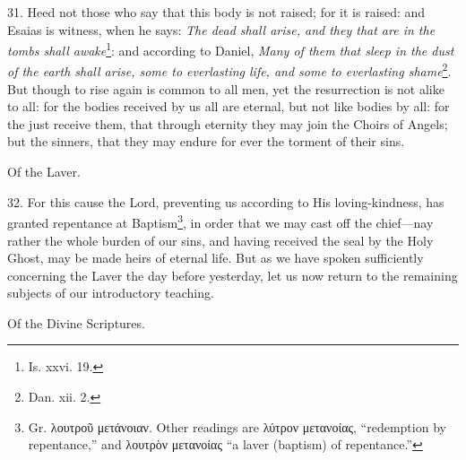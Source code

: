 31. Heed not those who say that this body is not raised; for it is raised: and Esaias is witness, when he says: \emph{The dead shall arise, and they that are in the tombs shall awake}\footnote{Is. xxvi. 19.}: and according to Daniel, \emph{Many of them that sleep in the dust of the earth shall arise, some to everlasting life, and some to everlasting shame}\footnote{Dan. xii. 2.}. But though to rise again is common to all men, yet the resurrection is not alike to all: for the bodies received by us all are eternal, but not like bodies by all: for the just receive them, that through eternity they may join the Choirs of Angels; but the sinners, that they may endure for ever the torment of their sins.

Of the Laver.

32. For this cause the Lord, preventing us according to His loving-kindness, has granted repentance at Baptism\footnote{Gr. \textgreek{λουτροῦ μετάνοιαν}. Other readings are \textgreek{λύτρον μετανοίας}, “redemption by repentance,” and \textgreek{λουτρὸν μετανοίας} “a laver (baptism) of repentance.”}, in order that we may cast off the chief—nay rather the whole burden of our sins, and having received the seal by the Holy Ghost, may be made heirs of eternal life. But as we have spoken sufficiently concerning the Laver the day before yesterday, let us now return to the remaining subjects of our introductory teaching.

Of the Divine Scriptures.

